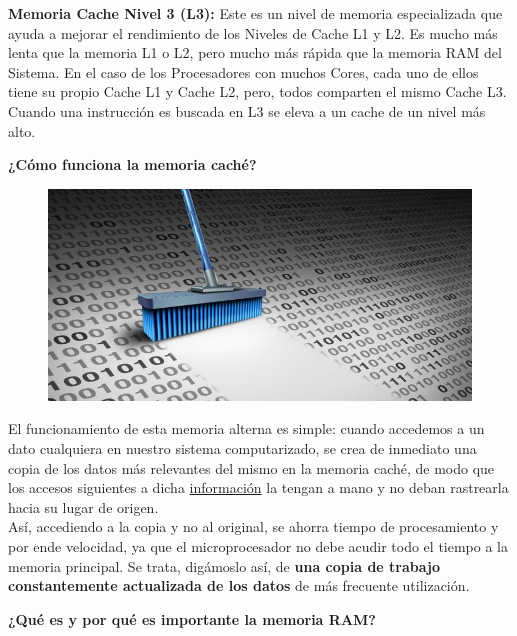 \documentclass[10pt,letterpaper]{article}
\begin{document}
\begin{justify}
	\noindent
	\textbf{Memoria Cache Nivel 3 (L3):}
	Este es un nivel de memoria especializada que ayuda a mejorar el rendimiento de los Niveles de Cache L1 y L2. Es mucho más lenta que la memoria L1 o L2, pero mucho más rápida que la memoria RAM del Sistema. En el caso de los Procesadores con muchos Cores, cada uno de ellos tiene su propio Cache L1 y Cache L2, pero, todos comparten el mismo Cache L3. Cuando una instrucción es buscada en L3 se eleva a un cache de un nivel más alto.\\
	
	\newpage
	
	\begin{center}
		\textbf{¿Cómo funciona la memoria caché?}
	\end{center}

	\begin{figure}[h]
	\centering
	\includegraphics[scale=0.35]{images/funcionamiento.jpg}
	\end{figure}

	El funcionamiento de esta memoria alterna es simple: cuando accedemos a un dato cualquiera en nuestro sistema computarizado, se crea de inmediato una copia de los datos más relevantes del mismo en la memoria caché, de modo que los accesos siguientes a dicha \underline{información} la tengan a mano y no deban rastrearla hacia su lugar de origen.\\

	\noindent
	Así, accediendo a la copia y no al original, se ahorra tiempo de procesamiento y por ende velocidad, ya que el microprocesador no debe acudir todo el tiempo a la memoria principal. Se trata, digámoslo así, de \textbf{una copia de trabajo constantemente actualizada de los datos} de más frecuente utilización.\\

	\newpage
\begin{center}
	\textbf{¿Qué es y por qué es importante la memoria RAM?}
	\end{center}
	

\end{justify}
\end{document}
